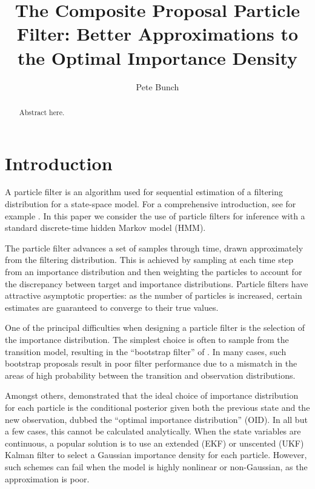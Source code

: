 \documentclass{statsoc}
\title[Composite Proposal Particle Filter]{The Composite Proposal Particle Filter: Better Approximations to the Optimal Importance Density}
\author[Bunch {\it et al.}]{Pete Bunch}
\begin{document}
\begin{abstract}
Abstract here.
\end{abstract}






\section{Introduction}

A particle filter is an algorithm used for sequential estimation of a filtering distribution for a state-space model. For a comprehensive introduction, see for example \citep{Cappe2007,Doucet2009}. In this paper we consider the use of particle filters for inference with a standard discrete-time hidden Markov model (HMM).

The particle filter advances a set of samples through time, drawn approximately from the filtering distribution. This is achieved by sampling at each time step from an importance distribution and then weighting the particles to account for the discrepancy between target and importance distributions. Particle filters have attractive asymptotic properties: as the number of particles is increased, certain estimates are guaranteed to converge to their true values. %

One of the principal difficulties when designing a particle filter is the selection of the importance distribution. The simplest choice is often to sample from the transition model, resulting in the ``bootstrap filter'' of \citep{Gordon1993}. In many cases, such bootstrap proposals result in poor filter performance due to a mismatch in the areas of high probability between the transition and observation distributions.

Amongst others, \citet{Doucet2000a} demonstrated that the ideal choice of importance distribution for each particle is the conditional posterior given both the previous state and the new observation, dubbed the ``optimal importance distribution'' (OID). In all but a few cases, this cannot be calculated analytically. When the state variables are continuous, a popular solution is to use an extended (EKF) or unscented (UKF) Kalman filter to select a Gaussian importance density for each particle. However, such schemes can fail when the model is highly nonlinear or non-Gaussian, as the approximation is poor.
\end{document}
